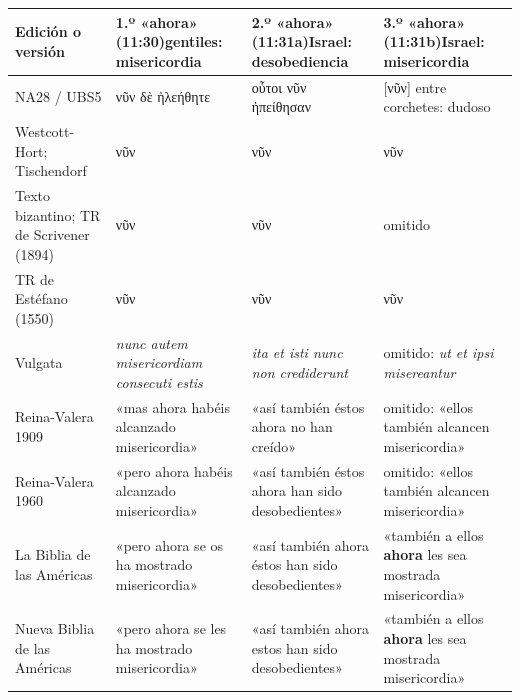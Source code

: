 \documentclass[11pt,letterpaper]{article}
\newcommand{\grc}[1]{\foreignlanguage{ancientgreek}{#1}}
\begin{document}
\begin{center}\footnotesize
\renewcommand{\arraystretch}{1.3}
\begin{tabular}{>{\RaggedRight\arraybackslash}p{3.0cm}>{\RaggedRight\arraybackslash}p{3.3cm}>{\RaggedRight\arraybackslash}p{3.3cm}>{\RaggedRight\arraybackslash}p{4.0cm}}
\toprule
\textbf{Edición o versión} & \textbf{1.º «ahora» (11:30)}\newline gentiles: misericordia & \textbf{2.º «ahora» (11:31a)}\newline Israel: desobediencia & \textbf{3.º «ahora» (11:31b)}\newline Israel: misericordia\\
\midrule
NA28 / UBS5 & \grc{νῦν δὲ ἠλεήθητε} & \grc{οὗτοι νῦν ἠπείθησαν} & \grc{[νῦν]} entre corchetes: dudoso\\
Westcott-Hort; Tischendorf & \grc{νῦν} & \grc{νῦν} & \grc{νῦν}\\
Texto bizantino; TR de Scrivener (1894) & \grc{νῦν} & \grc{νῦν} & \textcolor{ladrillo}{omitido}\\
TR de Estéfano (1550) & \grc{νῦν} & \grc{νῦν} & \grc{νῦν}\\
Vulgata & \emph{nunc autem misericordiam consecuti estis} & \emph{ita et isti nunc non crediderunt} & \textcolor{ladrillo}{omitido}: \emph{ut et ipsi misereantur}\\
Reina-Valera 1909 & «mas ahora habéis alcanzado misericordia» & «así también éstos ahora no han creído» & \textcolor{ladrillo}{omitido}: «ellos también alcancen misericordia»\\
Reina-Valera 1960 & «pero ahora habéis alcanzado misericordia» & «así también éstos ahora han sido desobedientes» & \textcolor{ladrillo}{omitido}: «ellos también alcancen misericordia»\\
La Biblia de las Américas & «pero ahora se os ha mostrado misericordia» & «así también ahora éstos han sido desobedientes» & «también a ellos \textbf{ahora} les sea mostrada misericordia»\\
Nueva Biblia de las Américas & «pero ahora se les ha mostrado misericordia» & «así también ahora estos han sido desobedientes» & «también a ellos \textbf{ahora} les sea mostrada misericordia»\\
\bottomrule
\end{tabular}\end{center}
\end{document}
